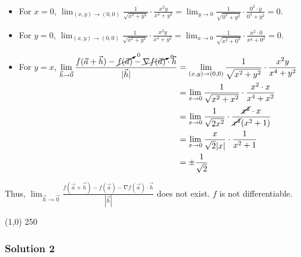 \documentclass[11pt,fleqn]{book} %
\begin{document}
\begin{itemize}
    \item For $x = 0$, $\lim_{(x,y)\to(0,0)} \frac{1}{\sqrt{x^2+y^2}} \cdot \frac{x^2y}{x^4 + y^2} = \lim_{y\to0} \frac{1}{\sqrt{0^2+y^2}} \cdot \frac{0^2 \cdot y}{0^4 + y^2} = 0$. 
    \item For $y = 0$, $\lim_{(x,y)\to(0,0)} \frac{1}{\sqrt{x^2+y^2}} \cdot \frac{x^2y}{x^4 + y^2} = \lim_{x\to0} \frac{1}{\sqrt{x^2+0^2}} \cdot \frac{x^2 \cdot 0}{x^4 + 0^2} = 0$. 
    \item For $y = x$, $\begin{aligned}[t]
        \lim_{\vec{h}\to\vec{0}} \frac{f(\vec{a} + \vec{h}) - \cancelto{0}{f(\vec{a})} - \cancelto{0}{\nabla f(\vec{a})} \cdot \vec{h}}{| \vec{h} |}
         & = \lim_{(x,y)\to(0,0)} \frac{1}{\sqrt{x^2+y^2}} \cdot \frac{x^2y}{x^4 + y^2}                   \\
         & = \lim_{x\to0} \frac{1}{\sqrt{x^2 + x^2}} \cdot \frac{x^2 \cdot x}{x^4 + x^2}                  \\
         & = \lim_{x\to0} \frac{1}{\sqrt{2x^2}} \cdot \frac{\cancel{x^2} \cdot x}{\cancel{x^2} (x^2 + 1)} \\
         & = \lim_{x\to0} \frac{x}{\sqrt{2}|x|} \cdot \frac{1}{x^2 + 1}                                   \\
         & = \pm \frac{1}{\sqrt{2}}
    \end{aligned}$
\end{itemize}

Thus, $\lim_{\vec{h}\to\vec{0}} \frac{f(\vec{a} + \vec{h}) - f(\vec{a}) - \nabla f(\vec{a}) \cdot \vec{h}}{| \vec{h} |}$ does not exist. $f$ is not differentiable. 

\begin{center} \line(1,0) {250} \end{center}

\subsubsection*{Solution 2}
\end{document}
